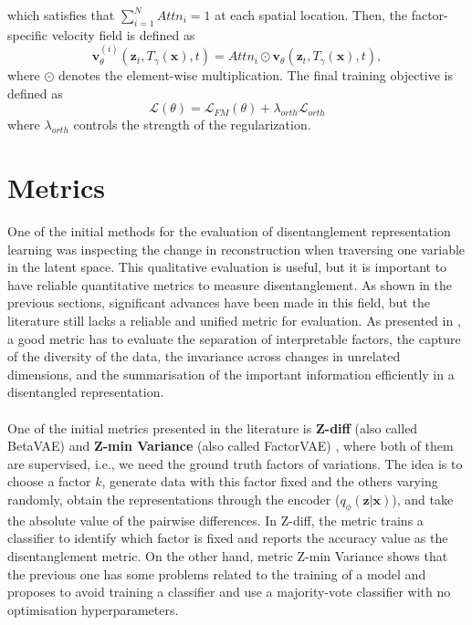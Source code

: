 which satisfies that $\sum_{i=1}^N Attn_i = 1$ at each spatial location. Then, the factor-specific velocity field is defined as 
\begin{equation}
    \mathbf{v}_{\theta}^{(i)}(\mathbf{z}_t, T_{\gamma}(\mathbf{x}), t) = Attn_i \odot \mathbf{v}_{\theta}(\mathbf{z}_t, T_{\gamma}(\mathbf{x}), t),
\end{equation}
where $\odot$ denotes the element-wise multiplication. The final training objective is defined as 
\begin{equation}
    \mathcal{L}(\theta) = \mathcal{L}_{FM}(\theta) + \lambda_{orth} \mathcal{L}_{orth}
\end{equation}
where $\lambda_{orth}$ controls the strength of the regularization. 


\section{Metrics}  
One of the initial methods for the evaluation of disentanglement representation learning was inspecting the change in reconstruction when traversing one variable in the latent space. This qualitative evaluation is useful, but it is important to have reliable quantitative metrics to measure disentanglement. As shown in the previous sections, significant advances have been made in this field, but the literature still lacks a reliable and unified metric for evaluation. As presented in \cite{julka2024improvedmetricevaluatingdisentangled}, a good metric has to evaluate the separation of interpretable factors, the capture of the diversity of the data, the invariance across changes in unrelated dimensions, and the summarisation of the important information efficiently in a disentangled representation. \\
\\
One of the initial metrics presented in the literature is \textbf{Z-diff} (also called BetaVAE) \cite{higgins2017betavae} and \textbf{Z-min Variance} (also called FactorVAE) \cite{kim2019disentanglingfactorising}, where both of them are supervised, i.e., we need the ground truth factors of variations. The idea is to choose a factor $k$, generate data with this factor fixed and the others varying randomly, obtain the representations through the encoder ($q_{\phi}(\mathbf{z}|\mathbf{x})$), and take the absolute value of the pairwise differences. In Z-diff, the metric trains a classifier to identify which factor is fixed and reports the accuracy value as the disentanglement metric. On the other hand, metric Z-min Variance shows that the previous one has some problems related to the training of a model and proposes to avoid training a classifier and use a majority-vote classifier with no optimisation hyperparameters. \\
